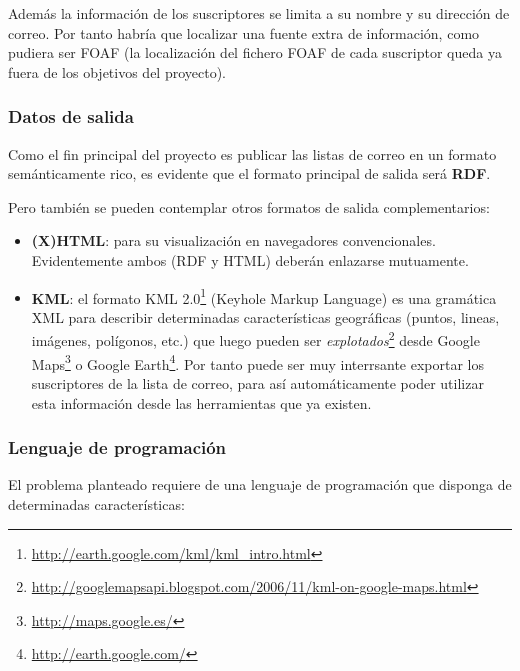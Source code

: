 Además la información de los suscriptores se limita a su nombre y su dirección de 
correo. Por tanto habría que localizar una fuente extra de información, como 
pudiera ser FOAF (la localización del fichero FOAF de cada suscriptor queda ya 
fuera de los objetivos del proyecto).

\subsubsection{Datos de salida}

Como el fin principal del proyecto es publicar las listas de correo en un
formato semánticamente rico, es evidente que el formato principal de salida
será \textbf{RDF}.

Pero también se pueden contemplar otros formatos de salida complementarios:

\begin{itemize}
  \item \textbf{(X)HTML}: para su visualización en navegadores convencionales.
	Evidentemente ambos (RDF y HTML) deberán enlazarse mutuamente.
  \item \textbf{KML}: el formato KML 2.0\footnote{\url{http://earth.google.com/kml/kml_intro.html}}
	(Keyhole Markup Language) es una gramática XML para describir determinadas
	características geográficas (puntos, lineas, imágenes, polígonos, etc.)
	que luego pueden ser 
	\emph{explotados}\footnote{\url{http://googlemapsapi.blogspot.com/2006/11/kml-on-google-maps.html}} 
	desde Google Maps\footnote{\url{http://maps.google.es/}} o
	Google Earth\footnote{\url{http://earth.google.com/}}. Por tanto
	puede ser muy interrsante exportar los suscriptores de la lista de
	correo, para así automáticamente poder utilizar esta información
	desde las herramientas que ya existen.
\end{itemize}

\subsubsection{Lenguaje de programación}

El problema planteado requiere de una lenguaje de programación que disponga
de determinadas características:

